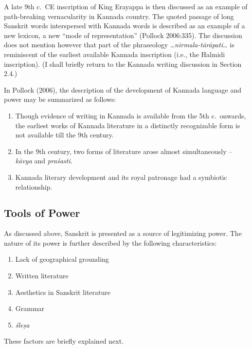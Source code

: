 A late 9th c.\ CE inscription of King Erayappa is then discussed as an example of path-breaking vernacularity in Kannada country. The quoted passage of long Sanskrit words interspersed with Kannada words is described as an example of a new lexicon, a new “mode of representation” (Pollock 2006:335). The discussion does not mention however that part of the phraseology …{\sl nirmala-tārāpati}… is reminiscent of the earliest available Kannada inscription (i.e., the Halmidi inscription). (I shall briefly return to the Kannada writing discussion in Section 2.4.) 

In Pollock (2006), the description of the development of Kannada language and power may be summarized as follows: 
\begin{enumerate}
\itemsep=0pt
\item Though evidence of writing in Kannada is available from the 5th c.\ onwards, the earliest works of Kannada literature in a distinctly recognizable form is not available till the 9th century.
\item In the 9th century, two forms of literature arose almost simultaneously – {\sl kāvya} and {\sl praśasti}.
\item Kannada literary development and its royal patronage had a symbiotic relationship. 
\end{enumerate}

\subsection{Tools of Power}

As discussed above, Sanskrit is presented as a source of legitimizing power. The nature of its power is further described by the following characteristics:
\begin{enumerate}
\itemsep=0pt
\item Lack of geographical grounding
\item Written literature
\item Aesthetics in Sanskrit literature
\item Grammar
\item {\sl śleṣa}
\end{enumerate}

These factors are briefly explained next. 

